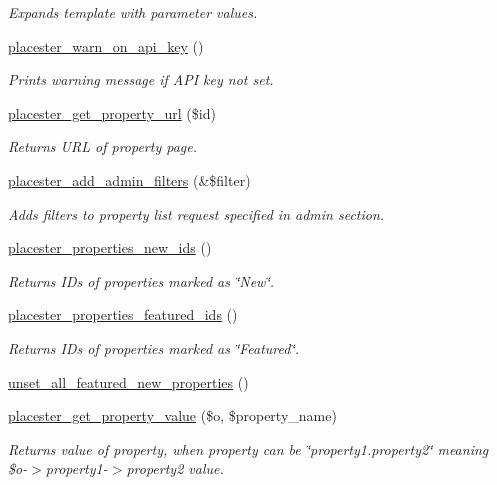 \begin{DoxyCompactItemize}
\begin{DoxyCompactList}\small\item\em Expands template with parameter values. \end{DoxyCompactList}\item 
\hyperlink{util_8php_a6932f0b5d3784049285e91da90add470}{placester\_\-warn\_\-on\_\-api\_\-key} ()
\begin{DoxyCompactList}\small\item\em Prints warning message if API key not set. \end{DoxyCompactList}\item 
\hyperlink{util_8php_a78aeebe74b10e344cc0bec34530e6508}{placester\_\-get\_\-property\_\-url} (\$id)
\begin{DoxyCompactList}\small\item\em Returns URL of property page. \end{DoxyCompactList}\item 
\hyperlink{util_8php_ae7d2f6e0d430b50ce218485f1cc437cc}{placester\_\-add\_\-admin\_\-filters} (\&\$filter)
\begin{DoxyCompactList}\small\item\em Adds filters to property list request specified in admin section. \end{DoxyCompactList}\item 
\hyperlink{util_8php_a2f72d266165544241676c049c1ba5ab6}{placester\_\-properties\_\-new\_\-ids} ()
\begin{DoxyCompactList}\small\item\em Returns IDs of properties marked as \char`\"{}New\char`\"{}. \end{DoxyCompactList}\item 
\hyperlink{util_8php_a645aaf92ab2b87210177855a56a5d9d1}{placester\_\-properties\_\-featured\_\-ids} ()
\begin{DoxyCompactList}\small\item\em Returns IDs of properties marked as \char`\"{}Featured\char`\"{}. \end{DoxyCompactList}\item 
\hyperlink{util_8php_aacca2174a3db71bc70789c76c773fabd}{unset\_\-all\_\-featured\_\-new\_\-properties} ()
\item 
\hyperlink{util_8php_ada4b86705cc53fcba5020d9d695fbd9f}{placester\_\-get\_\-property\_\-value} (\$o, \$property\_\-name)
\begin{DoxyCompactList}\small\item\em Returns value of property, when property can be \char`\"{}property1.property2\char`\"{} meaning \$o-\/$>$property1-\/$>$property2 value. \end{DoxyCompactList}\item 

\end{DoxyCompactItemize}
